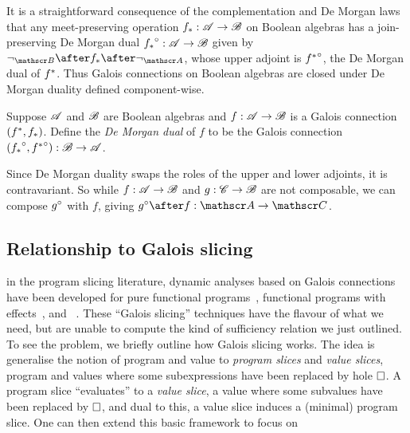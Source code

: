 

It is a straightforward consequence of the complementation and De Morgan laws that any meet-preserving operation ${f}_*: \mathscr{A} \to \mathscr{B}$ on Boolean algebras has a join-preserving De Morgan dual ${{f}_*}^{\circ}: \mathscr{A} \to \mathscr{B}$ given by $\neg_{\Ann{B}} \after \upperAdj{f} \after \neg_{\Ann{A}}$, whose upper adjoint is ${{f}^*}^{\circ}$, the De Morgan dual of ${f}^*$. Thus Galois connections on Boolean algebras are closed under De Morgan duality defined component-wise.

\begin{definition}
   Suppose $\mathscr{A}$ and $\mathscr{B}$ are Boolean algebras and $f: \mathscr{A} \to \mathscr{B}$ is a Galois connection $({f}^*,{f}_*)$. Define the \emph{De Morgan dual} of $f$ to be the Galois connection $({{f}_*}^{\circ}, {{f}^*}^{\circ}): \mathscr{B} \to \mathscr{A}$.
\end{definition}

\noindent Since De Morgan duality swaps the roles of the upper and lower adjoints, it is contravariant. So while $f: \mathscr{A} \to \mathscr{B}$ and $g: \mathscr{C} \to \mathscr{B}$ are not composable, we can compose ${g}^{\circ}$ with $f$, giving $\dual{g} \after f: \Ann{A} \to \Ann{C}$.



\subsection{Relationship to Galois slicing}

in the program slicing literature, dynamic analyses based on Galois connections have been developed for pure functional programs~\cite{perera12a}, functional programs with effects~\cite{ricciotti17}, and \piCalculus~\cite{perera16d}. These ``Galois slicing'' techniques have the flavour of what we need, but are unable to compute the kind of sufficiency relation we just outlined. To see the problem, we briefly outline how Galois slicing works. The idea is generalise the notion of program and value to \emph{program slices} and \emph{value slices}, program and values where some subexpressions have been replaced by hole $\square$. A program slice ``evaluates'' to a \emph{value slice}, a value where some subvalues have been replaced by $\square$, and dual to this, a value slice induces a (minimal) program slice. One can then extend this basic framework to focus on

